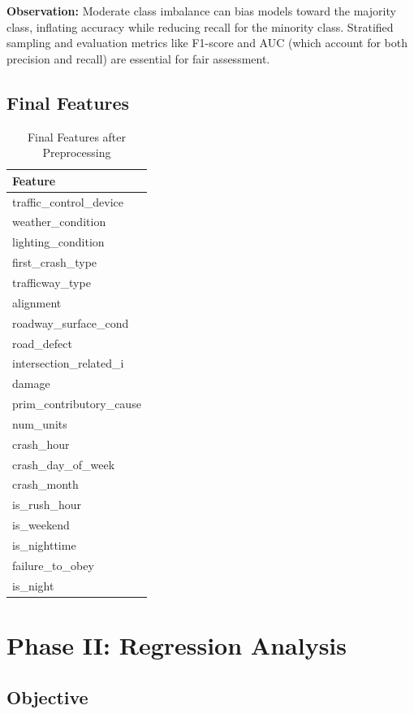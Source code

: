 \documentclass[stu,12pt,floatsintext]{apa7}
\begin{document}
\textbf{Observation:} Moderate class imbalance can bias models toward the majority class,
inflating accuracy while reducing recall for the minority class. Stratified sampling and
evaluation metrics like F1-score and AUC (which account for both precision and recall) are
essential for fair assessment.

\subsection{Final Features}

\begin{table}[H]
\centering
\caption{Final Features after Preprocessing}
\begin{tabular}{l}
\toprule
\textbf{Feature} \\
\midrule
traffic\_control\_device \\
weather\_condition \\
lighting\_condition \\
first\_crash\_type \\
trafficway\_type \\
alignment \\
roadway\_surface\_cond \\
road\_defect \\
intersection\_related\_i \\
damage \\
prim\_contributory\_cause \\
num\_units \\
crash\_hour \\
crash\_day\_of\_week \\
crash\_month \\
is\_rush\_hour \\
is\_weekend \\ 
is\_nighttime \\
failure\_to\_obey \\
is\_night \\
\bottomrule
\end{tabular}
\end{table}

\section{Phase II: Regression Analysis}

\subsection{Objective}
\end{document}
